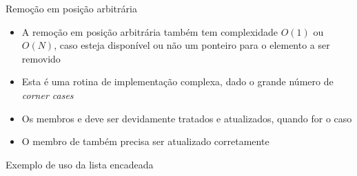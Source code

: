 \begin{frame}[fragile]{Remoção em posição arbitrária}

    \begin{itemize}
        \item A remoção em posição arbitrária também tem complexidade $O(1)$ ou $O(N)$, 
            caso esteja disponível ou não um ponteiro para o elemento a ser removido

        \item Esta é uma rotina de implementação complexa, dado o grande número de 
            \textit{corner cases}

        \item Os membros  e  deve ser devidamente tratados e
            atualizados, quando for o caso

        \item O membro  de  também precisa ser atualizado
            corretamente
    \end{itemize}

\end{frame}

\begin{frame}[fragile]{Exemplo de uso da lista encadeada}
\end{frame}
